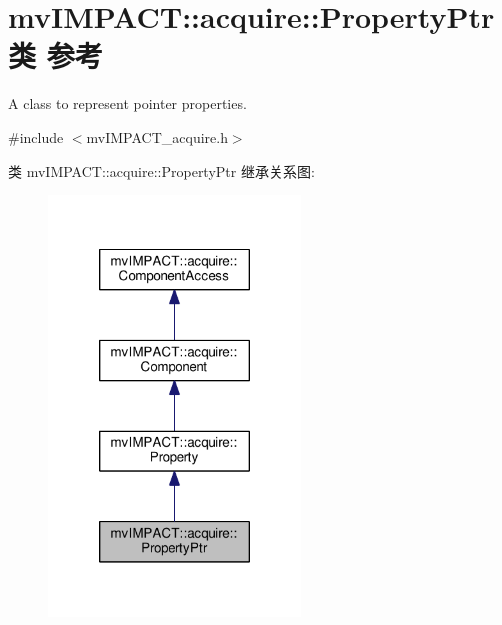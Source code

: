 \hypertarget{classmv_i_m_p_a_c_t_1_1acquire_1_1_property_ptr}{\section{mv\+I\+M\+P\+A\+C\+T\+:\+:acquire\+:\+:Property\+Ptr类 参考}
\label{classmv_i_m_p_a_c_t_1_1acquire_1_1_property_ptr}
}


A class to represent pointer properties.  




{\ttfamily \#include $<$mv\+I\+M\+P\+A\+C\+T\+\_\+acquire.\+h$>$}



类 mv\+I\+M\+P\+A\+C\+T\+:\+:acquire\+:\+:Property\+Ptr 继承关系图\+:
\nopagebreak
\begin{figure}[H]
\begin{center}
\leavevmode
\includegraphics[width=190pt]{classmv_i_m_p_a_c_t_1_1acquire_1_1_property_ptr__inherit__graph}
\end{center}
\end{figure}


